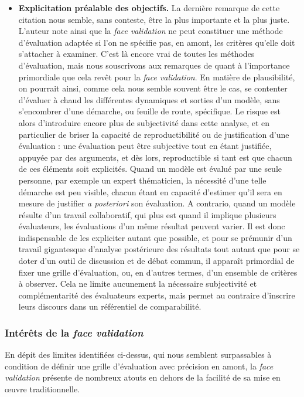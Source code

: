 \begin{itemize}
	\item \textbf{Explicitation préalable des objectifs.}
	La dernière remarque de cette citation nous semble, sans conteste, être la plus importante et la plus juste.
	L'auteur note ainsi que la \textit{face validation} ne peut constituer une méthode d'évaluation adaptée si l'on ne spécifie pas, en amont, les critères qu'elle doit s'attacher à examiner.
	C'est là encore vrai de toutes les méthodes d'évaluation, mais nous souscrivons aux remarques de \citeauthor{hermann_validation_1967} quant à l'importance primordiale que cela revêt pour la \textit{face validation}.
	En matière de plausibilité, on pourrait ainsi, comme cela nous semble souvent être le cas, se contenter d'évaluer \og à chaud\fg{} les différentes dynamiques et sorties d'un modèle, sans s'encombrer d'une démarche, ou feuille de route, spécifique.
	Le risque est alors d'introduire encore plus de subjectivité dans cette analyse, et en particulier de briser la capacité de reproductibilité ou de justification d'une évaluation :
	une évaluation peut être subjective tout en étant justifiée, appuyée par des arguments, et dès lors, reproductible si tant est que chacun de ces éléments soit explicités.
	Quand un modèle est évalué par une seule personne, par exemple un expert thématicien, la nécessité d'une telle démarche est peu visible, chacun étant en capacité d'estimer qu'il sera en mesure de justifier \textit{a posteriori} son évaluation.
	A contrario, quand un modèle résulte d'un travail collaboratif, qui plus est quand il implique plusieurs évaluateurs, les évaluations d'un même résultat peuvent varier.
	Il est donc indispensable de les expliciter autant que possible, et pour se prémunir d'un travail gigantesque d'analyse postérieure des résultats tout autant que pour se doter d'un outil de discussion et de débat commun, il apparaît primordial de fixer une grille d'évaluation, ou, en d'autres termes, d'un ensemble de critères à observer.
	Cela ne limite aucunement la nécessaire subjectivité et complémentarité des évaluateurs experts, mais permet au contraire d'inscrire leurs discours dans un référentiel de comparabilité.
	
\end{itemize}

\subsubsection{Intérêts de la \textit{face validation} \label{subsubsec:interets-face-validation}}

En dépit des limites identifiées ci-dessus, qui nous semblent surpassables à condition de définir une grille d'évaluation avec précision en amont, la \textit{face validation} présente de nombreux atouts en dehors de la facilité de sa mise en œuvre traditionnelle.

